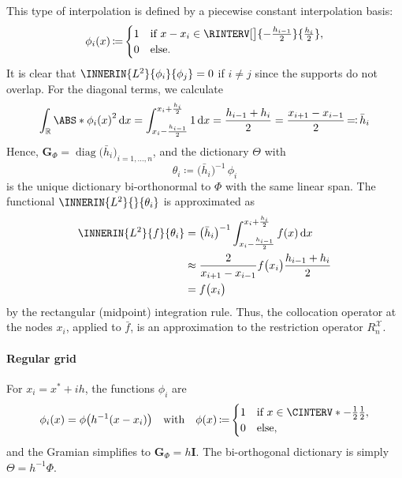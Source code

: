 \documentclass[a4paper]{paper}
\newcommand*{\SPC}[1]{{\ensuremath{\mathscr{#1}}}}
\newcommand{\RR}{{\ensuremath{\mathbb{R}}}}
\newcommand*{\REST}[2]{\ensuremath{R_{#1}^{#2}}}
\newcommand*{\RnX}{{\ensuremath{\REST{n}{\SPC{X}}}}}
\DeclareMathOperator{\DIAG}{{diag}}
\DeclareMathOperator{\DEFEQ}{{\coloneqq}}
\DeclareMathOperator{\EQDEF}{{\eqqcolon}}
\newcommand*{\D}{{\ensuremath{\mathrm{d}}}}
\newcommand*{\BDG}{\boldsymbol{G}}
\newcommand*{\BDI}{\boldsymbol{I}}
\begin{document}
This type of interpolation is defined by a piecewise constant interpolation basis:
%
\begin{equation*}
 \phi_i(x) \DEFEQ 
 \begin{cases}
  1 & \text{if } x - x_i \in \RINTERV[\big]{- \tfrac{h_{i-1}}{2}}{\frac{h_i}{2}}, \\
  0 & \text{else}.
 \end{cases}
\end{equation*}
%
It is clear that $\INNERIN{L^2}{\phi_i}{\phi_j} = 0$ if $i \neq j$ since the supports do not overlap. For 
the diagonal terms, we calculate
%
\begin{equation*}
 \int_\RR \ABS*{\phi_i(x)}^2\, \D x 
 = \int_{x_i - \frac{h_{i-1}}{2}}^{x_i + \frac{h_i}{2}} 1\, \D x
 = \frac{h_{i-1} + h_i}{2} = \frac{x_{i+1} - x_{i-1}}{2}
 \EQDEF \bar h_i
\end{equation*}
%
Hence, $\BDG_\Phi = \DIAG\big( \bar h_i \big)_{i=1,\dots,n}$, and the dictionary $\Theta$ with
%
\begin{equation*}
 \theta_i \DEFEQ \big( \bar h_i \big)^{-1}\, \phi_i
\end{equation*}
%
is the unique dictionary bi-orthonormal to $\Phi$ with the same linear span. The functional 
$\INNERIN{L^2}{}{\theta_i}$ is approximated as
%
\begin{align*}
 \INNERIN{L^2}{f}{\theta_i}
 &= \big( \bar h_i \big)^{-1} \int_{x_i - \frac{h_{i-1}}{2}}^{x_i + 
 \frac{h_i}{2}} f(x)\, \D x \\
 &\approx  \frac{2}{x_{i+1} - x_{i-1}} f\big( x_i \big) \frac{h_{i-1} + h_i}{2} 
 \\
 &= f\big( x_i \big)
\end{align*}
%
by the rectangular (midpoint) integration rule. Thus, the collocation operator at the nodes $x_i$, applied to 
$\bar f$, is an approximation to the restriction operator $\RnX$.

\paragraph{Regular grid}

For $x_i = x^* + i h$, the functions $\phi_i$ are
%
\begin{equation*}
 \phi_i(x) = \phi\big( h^{-1}(x-x_i) \big)
 \quad \text{with} \quad
 \phi(x) \DEFEQ
 \begin{cases}
  1 & \text{if } x \in \CINTERV*{-\tfrac{1}{2}}{\tfrac{1}{2}}, \\
  0 & \text{else},
 \end{cases}
\end{equation*}
%
and the Gramian simplifies to $\BDG_\Phi = h \BDI$. The bi-orthogonal dictionary is simply $\Theta = h^{-1}\Phi$.
\end{document}

